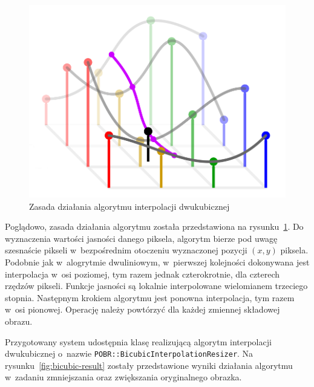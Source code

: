 \begin{figure}[h]
    \centering
    \includegraphics[width=\columnwidth]{figures/bicubic.png}
    \caption{Zasada działania algorytmu interpolacji dwukubicznej~\cite{WikipediaEN:bicubicimg}}
    \label{fig:bicubic-example}
\end{figure}

Poglądowo, zasada działania algorytmu została przedstawiona na rysunku~\ref{fig:bicubic-example}. Do wyznaczenia wartości jasności danego piksela, algorytm bierze pod uwagę szesnaście pikseli w~bezpośrednim otoczeniu wyznaczonej pozycji $(x,y)$ piksela. Podobnie jak w~alogrytmie dwuliniowym, w~pierwszej kolejności dokonywana jest interpolacja w~osi poziomej, tym razem jednak czterokrotnie, dla czterech rzędzów pikseli. Funkcje jasności są lokalnie interpolowane wielomianem trzeciego stopnia. Następnym krokiem algorytmu jest ponowna interpolacja, tym razem w~osi pionowej. Operację należy powtórzyć dla każdej zmiennej składowej obrazu.

Przygotowany system udostępnia klasę realizującą algorytm interpolacji dwukubicznej o~nazwie \texttt{POBR::BicubicInterpolationResizer}. Na rysunku~\ref{fig:bicubic-result} zostały przedstawione wyniki działania algorytmu w~zadaniu zmniejszania oraz zwiększania oryginalnego obrazka.

